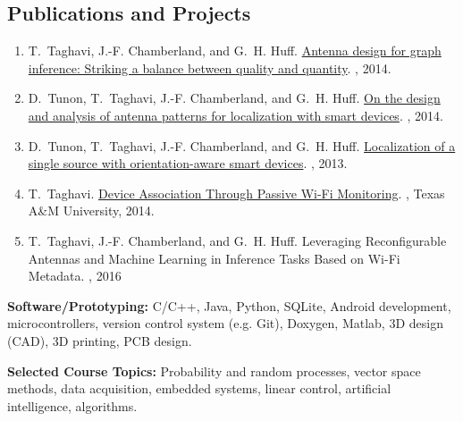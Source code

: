 \subsection*{Publications and Projects}

\begin{enumerate}    \itemsep0pt

\item T.~Taghavi, J.-F. Chamberland, and G.~H. Huff.
\newblock \href{http://dx.doi.org/10.1109/USNC-URSI-NRSM.2014.6927995}{Antenna design for graph inference: Striking a balance between quality and quantity}.
, 2014.

\item D.~Tunon, T.~Taghavi, J.-F. Chamberland, and G.~H. Huff.
\newblock \href{http://dx.doi.org/10.1109/USNC-URSI-NRSM.2014.6928007}{On the design and analysis of antenna patterns for localization with smart devices}.
, 2014.

\item D.~Tunon, T.~Taghavi, J.-F. Chamberland, and G.~H. Huff.
\newblock \href{http://dx.doi.org/10.1109/GlobalSIP.2013.6736829}{Localization of a single source with orientation-aware smart devices}.
, 2013.

\item T.~Taghavi.
\newblock \href{http://hdl.handle.net/1969.1/152045}{Device Association Through Passive Wi-Fi Monitoring}.
, Texas A\&M University, 2014.

\item T.~Taghavi, J.-F. Chamberland, and G.~H. Huff.
\newblock Leveraging Reconfigurable Antennas and Machine Learning in Inference Tasks Based on Wi-Fi Metadata.
, 2016
\end{enumerate}

\textbf{Software/Prototyping:} C/C++, Java, Python, SQLite,
Android development, microcontrollers,
version control system (e.g. Git), Doxygen, Matlab,
3D design (CAD), 3D printing, PCB design.

\textbf{Selected Course Topics:} Probability and random processes, vector space methods, data acquisition, embedded systems, linear control, artificial intelligence, algorithms.

